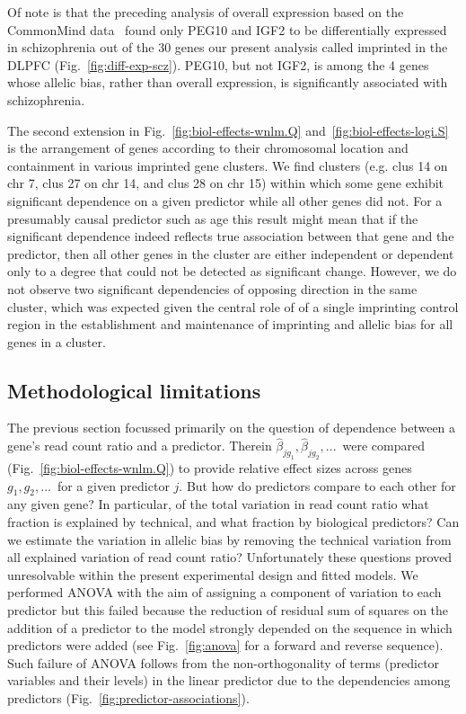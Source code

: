 \documentclass[12pt,letterpaper]{article}
\begin{document}
Of note is that the preceding analysis of overall expression based on the
CommonMind data~\cite{Fromer2016a} found only PEG10 and IGF2 to be
differentially expressed in schizophrenia out of the 30 genes our present
analysis called imprinted in the DLPFC (Fig.~\ref{fig:diff-exp-scz}). PEG10,
but not IGF2, is among the 4 genes whose allelic bias, rather than overall
expression, is significantly associated with schizophrenia.

The second extension in Fig.~\ref{fig:biol-effects-wnlm.Q}
and~\ref{fig:biol-effects-logi.S} is the arrangement of genes according to
their chromosomal location and containment in various imprinted gene clusters.
We find clusters (e.g. clus 14 on chr 7, clus 27 on chr 14, and clus 28 on
chr 15) within which some gene exhibit significant dependence on a given
predictor while all other genes did not. For a presumably causal predictor such
as age this result might mean that if the significant dependence indeed
reflects true association between that gene and the predictor, then all other
genes in the cluster are either independent or dependent only to a degree that
could not be detected as significant change. However, we do not observe two
significant dependencies of opposing direction in the same cluster, which was
expected given the central role of of a single imprinting control region in
the establishment and maintenance of imprinting and allelic bias for all
genes in a cluster.

\subsection{Methodological limitations}
\label{sec:limitations}

The previous section focussed primarily on the question of dependence between
a gene's read count ratio and a predictor.  Therein \(\hat\beta_{jg_1},
\hat\beta_{jg_2},...\)~were compared (Fig.~\ref{fig:biol-effects-wnlm.Q}) to
provide relative effect sizes across genes \(g_1, g_2,...\)~for a given
predictor \(j\). But how do predictors compare to each other for any given
gene? In particular, of the total variation in read count ratio what fraction
is explained by technical, and what fraction by biological predictors? Can we
estimate the variation in allelic bias by removing the technical variation
from all explained variation of read count ratio?  Unfortunately these
questions proved unresolvable within the present experimental design and
fitted models. We performed ANOVA with the aim of assigning a component of
variation to each predictor but this failed because the reduction of residual
sum of squares on the addition of a predictor to the model strongly depended
on the sequence in which predictors were added (see Fig.~\ref{fig:anova} for a
forward and reverse sequence). Such failure of ANOVA follows from
the non-orthogonality of terms (predictor variables and their levels) in the
linear predictor due to the dependencies among predictors
(Fig.~\ref{fig:predictor-associations}).
\end{document}
